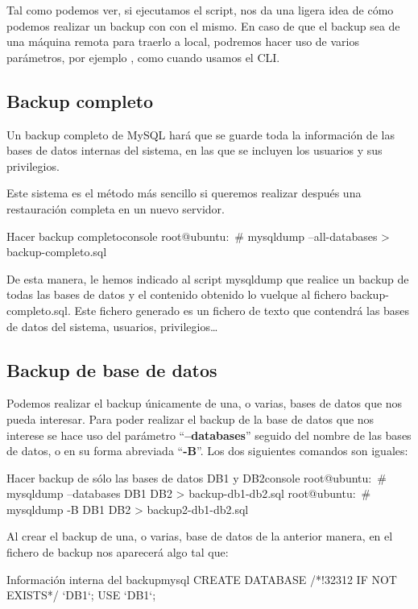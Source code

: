 Tal como podemos ver, si ejecutamos el script, nos da una ligera idea de cómo podemos realizar un backup con con el mismo. En caso de que el backup sea de una máquina remota para traerlo a local, podremos hacer uso de varios parámetros, por ejemplo , como cuando usamos el CLI.


\subsection{Backup completo}
Un backup completo de MySQL hará que se guarde toda la información de las bases de datos internas del sistema, en las que se incluyen los usuarios y sus privilegios.

Este sistema es el método más sencillo si queremos realizar después una restauración completa en un nuevo servidor.

\begin{mycode}{Hacer backup completo}{console}{}
root@ubuntu:~# mysqldump --all-databases > backup-completo.sql
\end{mycode}

De esta manera, le hemos indicado al script mysqldump que realice un backup de todas las bases de datos y el contenido obtenido lo vuelque al fichero backup-completo.sql. Este fichero generado es un fichero de texto que contendrá las bases de datos del sistema, usuarios, privilegios…

\subsection{Backup de base de datos}
Podemos realizar el backup únicamente de una, o varias, bases de datos que nos pueda interesar. Para poder realizar el backup de la base de datos que nos interese se hace uso del parámetro “\textbf{--databases}” seguido del nombre de las bases de datos, o en su forma abreviada “\textbf{-B}”. Los dos siguientes comandos son iguales:


\begin{mycode}{Hacer backup de sólo las bases de datos DB1 y DB2}{console}{}
root@ubuntu:~# mysqldump --databases DB1 DB2 > backup-db1-db2.sql
root@ubuntu:~# mysqldump -B DB1 DB2 > backup2-db1-db2.sql
\end{mycode}


Al crear el backup de una, o varias, base de datos de la anterior manera, en el fichero de backup nos aparecerá algo tal que:

\begin{mycode}{Información interna del backup}{mysql}{}
CREATE DATABASE /*!32312 IF NOT EXISTS*/ `DB1`;
USE `DB1`;
\end{mycode}

